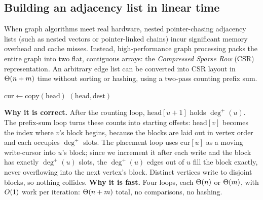 \subsection{Building an adjacency list in linear time}

When graph algorithms meet real hardware, nested pointer-chasing adjacency lists
(such as nested vectors or pointer-linked chains) incur significant memory
overhead and cache misses. Instead, high-performance graph processing packs the entire
graph into two flat, contiguous arrays: the \emph{Compressed Sparse Row} (CSR)
representation. An arbitrary edge list can be converted into CSR layout
in $\Theta(n+m)$ time without sorting or hashing, using a two-pass counting prefix sum.

\begin{algorithm}[H]
\caption{\textsc{BuildCSR}: edge list to compressed adjacency list}
\label{ch01:alg-csr}
 
 
$\mathrm{cur} \gets \mathrm{copy}(\mathrm{head})$\;
\Return $(\mathrm{head}, \mathrm{dest})$\;
\end{algorithm}

\begin{whybox}
\textbf{Why it is correct.} After the counting loop, $\mathrm{head}[u+1]$ holds
$\deg^+(u)$. The prefix-sum loop turns these counts into starting offsets:
$\mathrm{head}[v]$ becomes the index where $v$'s block begins, because the blocks
are laid out in vertex order and each occupies $\deg^+$ slots. The placement
loop uses $\mathrm{cur}[u]$ as a moving write-cursor into $u$'s block; since we
increment it after each write and the block has exactly $\deg^+(u)$ slots, the
$\deg^+(u)$ edges out of $u$ fill the block exactly, never overflowing into the
next vertex's block. Distinct vertices write to disjoint blocks, so nothing
collides. \textbf{Why it is fast.} Four loops, each $\Theta(n)$ or $\Theta(m)$, with
$O(1)$ work per iteration: $\Theta(n+m)$ total, no comparisons, no hashing.
\end{whybox}

